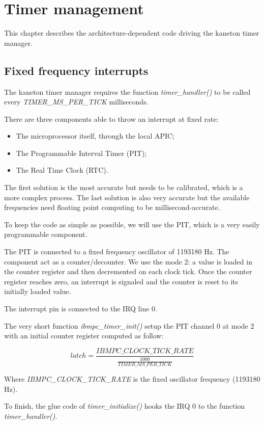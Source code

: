 %
%
%
%
%
%

%
%

\chapter{Timer management}

This chapter describes the architecture-dependent code driving the
kaneton timer manager.

\newpage

%
%

\section{Fixed frequency interrupts}

The kaneton timer manager requires the function
\textit{timer\_handler()} to be called every
\textit{TIMER\_MS\_PER\_TICK} milliseconds.

There are three components able to throw an interrupt at fixed rate:

\begin{itemize}
  \item
    The microprocessor itself, through the local APIC;
  \item
    The Programmable Interval Timer (PIT);
  \item
    The Real Time Clock (RTC).
\end{itemize}

The first solution is the most accurate but needs to be calibrated,
which is a more complex process. The last solution is also very
accurate but the available frequencies need floating point computing
to be millisecond-accurate.

To keep the code as simple as possible, we will use the PIT, which is
a very easily programmable component.

The PIT is connected to a fixed frequency oscillator of 1193180
Hz. The component act as a counter/decounter. We use the mode 2: a
value is loaded in the counter register and then decremented on each
clock tick. Once the counter register reaches zero, an interrupt is
signaled and the counter is reset to its initially loaded value.

The interrupt pin is connected to the IRQ line 0.

The very short function \textit{ibmpc\_timer\_init()} setup the PIT
channel 0 at mode 2 with an initial counter register computed as
follow:

$$
latch = \frac{IBMPC\_CLOCK\_TICK\_RATE}{\frac{1000}{TIMER\_MS\_PER\_TICK}}
$$

Where \textit{IBMPC\_CLOCK\_TICK\_RATE} is the fixed oscillator
frequency (1193180 Hz).

To finish, the glue code of \textit{timer\_initialize()} hooks the IRQ
0 to the function \textit{timer\_handler()}.
